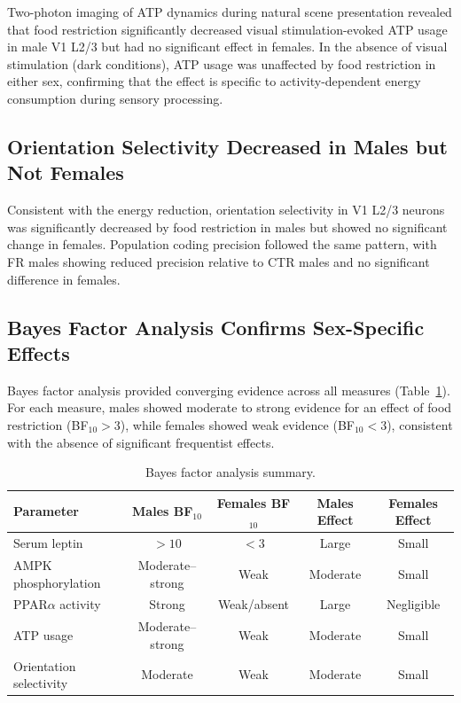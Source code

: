 \documentclass[11pt]{article}
\begin{document}
Two-photon imaging of ATP dynamics during natural scene presentation revealed that food restriction significantly decreased visual stimulation-evoked ATP usage in male V1 L2/3 but had no significant effect in females. In the absence of visual stimulation (dark conditions), ATP usage was unaffected by food restriction in either sex, confirming that the effect is specific to activity-dependent energy consumption during sensory processing.

\subsection{Orientation Selectivity Decreased in Males but Not Females}

Consistent with the energy reduction, orientation selectivity in V1 L2/3 neurons was significantly decreased by food restriction in males but showed no significant change in females. Population coding precision followed the same pattern, with FR males showing reduced precision relative to CTR males and no significant difference in females.

\subsection{Bayes Factor Analysis Confirms Sex-Specific Effects}

Bayes factor analysis provided converging evidence across all measures (Table~\ref{tab:bayes}). For each measure, males showed moderate to strong evidence for an effect of food restriction (BF$_{10} > 3$), while females showed weak evidence (BF$_{10} < 3$), consistent with the absence of significant frequentist effects.

\begin{table}[h]
\centering
\caption{Bayes factor analysis summary.}
\label{tab:bayes}
\begin{tabular}{lcccc}
\toprule
Parameter & Males BF$_{10}$ & Females BF$_{10}$ & Males Effect & Females Effect \\
\midrule
Serum leptin & $> 10$ & $< 3$ & Large & Small \\
AMPK phosphorylation & Moderate--strong & Weak & Moderate & Small \\
PPAR$\alpha$ activity & Strong & Weak/absent & Large & Negligible \\
ATP usage & Moderate--strong & Weak & Moderate & Small \\
Orientation selectivity & Moderate & Weak & Moderate & Small \\
\bottomrule
\end{tabular}
\end{table}
\end{document}
